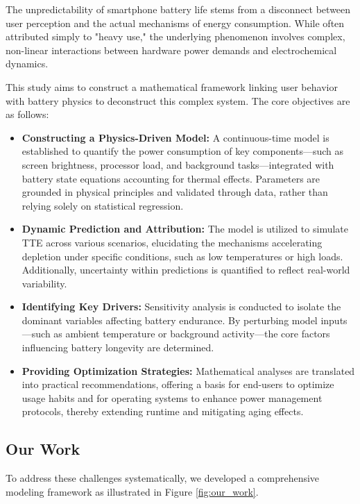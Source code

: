 \documentclass{mcmthesis}
\begin{document}
The unpredictability of smartphone battery life stems from a disconnect between user perception and the actual mechanisms of energy consumption. While often attributed simply to "heavy use," the underlying phenomenon involves complex, non-linear interactions between hardware power demands and electrochemical dynamics.

This study aims to construct a mathematical framework linking user behavior with battery physics to deconstruct this complex system. The core objectives are as follows:

\begin{itemize}
    \item \textbf{Constructing a Physics-Driven Model:} A continuous-time model is established to quantify the power consumption of key components—such as screen brightness, processor load, and background tasks—integrated with battery state equations accounting for thermal effects. Parameters are grounded in physical principles and validated through data, rather than relying solely on statistical regression.
    
    \item \textbf{Dynamic Prediction and Attribution:} The model is utilized to simulate TTE across various scenarios, elucidating the mechanisms accelerating depletion under specific conditions, such as low temperatures or high loads. Additionally, uncertainty within predictions is quantified to reflect real-world variability.
    
    \item \textbf{Identifying Key Drivers:} Sensitivity analysis is conducted to isolate the dominant variables affecting battery endurance. By perturbing model inputs—such as ambient temperature or background activity—the core factors influencing battery longevity are determined.
    
    \item \textbf{Providing Optimization Strategies:} Mathematical analyses are translated into practical recommendations, offering a basis for end-users to optimize usage habits and for operating systems to enhance power management protocols, thereby extending runtime and mitigating aging effects.
\end{itemize}

\subsection{Our Work}
To address these challenges systematically, we developed a comprehensive modeling framework as illustrated in Figure \ref{fig:our_work}.
\end{document}
